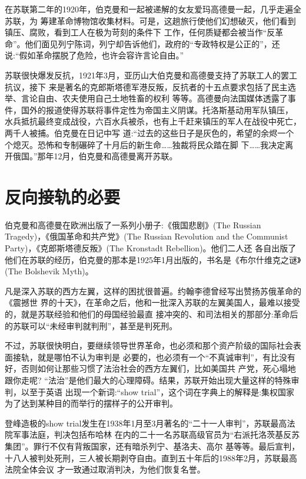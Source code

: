 \documentclass[10pt]{article}
\begin{document}
{在苏联第二年的1920年，伯克曼和一起被递解的女友爱玛\textperiodcentered 高德曼一起，几乎走遍全苏联，为
筹建革命博物馆收集材料。可是，这趟旅行使他们幻想破灭，他们看到镇压、腐败，看到工人在极为苛刻的条件下
工作，任何质疑都会被当作``反革命''。他们面见列宁陈词，列宁却告诉他们，政府的``专政特权是公正的''，还
说:``假如革命摆脱了危险，也许会容许言论自由。''

苏联很快爆发反抗，1921年3月，亚历山大\textperiodcentered 伯克曼和高德曼支持了苏联工人的罢工抗议，接下
来是著名的克郎斯塔德军港反叛，反抗者的十五点要求包括了民主选举、言论自由、农夫使用自己土地牲畜的权利
等等。高德曼向法国媒体透露了事件，国外的报道使得苏联将事件定性为帝国主义阴谋。托洛斯基动用军队镇压，
水兵抵抗最终变成战役，六百水兵被杀，也有上千赶来镇压的军人在战役中死亡，两千人被捕。伯克曼在日记中写
道:``过去的这些日子是灰色的，希望的余烬一个个熄灭。恐怖和专制碾碎了十月后的新生命……独裁将民众踏在脚
下……我决定离开俄国。''那年12月，伯克曼和高德曼离开苏联。

\pagebreak
\section{反向接轨的必要}

伯克曼和高德曼在欧洲出版了一系列小册子:《俄国悲剧》(The Russian Tragedy)，《俄国革命和共产党》(The
Russian Revolution and the Communist Party)，《克郎斯塔德反叛》(The Kronstadt Rebellion)。他们二人还
各自出版了他们在苏联的经历，伯克曼的那本是1925年1月出版的，书名是《布尔什维克之谜》(The Bolshevik
Myth)。

凡是深入苏联的西方左翼，这样的困扰很普遍。约翰\textperiodcentered 李德曾经写出赞扬苏俄革命的《震撼世
界的十天》，在革命之后，他和一批深入苏联的左翼美国人，最难以接受的，就是苏联经验和他们的母国经验最直
接冲突的、和司法相关的那部分:革命后的苏联可以``未经审判就判刑''，甚至是判死刑。

不过，苏联很快明白，要继续领导世界革命，也必须和那个资产阶级的国际社会表面接轨，就是哪怕不认为审判是
必要的，也必须有一个``不真诚审判''，有比没有好，否则如何让那些习惯了法治社会的西方左翼们，比如美国共
产党，死心塌地跟你走呢? ``法治''是他们最大的心理障碍。结果，苏联开始出现大量这样的特殊审判，以至于英语
出现一个新词:``show trial''，这个词在字典上的解释是:集权国家为了达到某种目的而举行的摆样子的公开审判。

登峰造极的show trial发生在1938年1月至3月著名的``二十一人审判''，苏联最高法院军事法庭，判决包括布哈林
在内的二十一名苏联高级官员为``右派托洛茨基反苏集团''。罪行不仅有背叛国家，还有暗杀列宁、基洛夫、高尔
基等等。最后宣判，十八人被判处死刑，三人被长期剥夺自由。直到五十年后的1988年2月，苏联最高法院全体会议
才一致通过取消判决，为他们恢复名誉。

}
\end{document}
